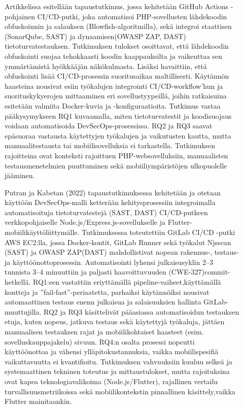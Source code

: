 \documentclass[bscthesis,finnish,oneside,biblatex]{uefcsthesis}
\begin{document}
\begin{description}
    \item[\cite{afifah2024_coi}] Artikkelissa esitellään tapaustutkimus, jossa kehitetään GitHub Actions -pohjainen CI/CD-putki, joka automatisoi PHP-sovellusten lähdekoodin obfuskoinnin ja salauksen (Blowfish-algoritmilla), sekä integroi staattisen (SonarQube, SAST) ja dynaamisen(OWASP ZAP, DAST) tietoturvatestauksen. Tutkimuksen tulokset osoittavat, että lähdekoodin obfuskointi suojaa tehokkaasti koodin kaappauksilta ja vaikeuttaa sen ymmärtämistä hyökkääjän näkökulmasta. Lisäksi havaittiin, että obfuskointi lisää CI/CD-prosessin suoritusaikaa maltillisesti. Käytännön haasteina nousivat esiin työkalujen integrointi CI/CD-workflow’hun ja suorituskykyerojen mittaaminen eri sovellustyypeillä, joihin ratkaisuina esitetään valmiita Docker-kuvia ja -konfiguraatioita. Tutkimus vastaa pääkysymykseen RQ1 kuvaamalla, miten tietoturvatestit ja koodisuojaus voidaan automatisoida DevSecOps-prosessissa. RQ2 ja RQ3 saavat epäsuoraa vastausta käytettyjen työkalujen ja vaikutusten kautta, mutta manuaalitestausta tai mobiilisovelluksia ei tarkastella. Tutkimuksen rajoitteina ovat konteksti rajoittuen PHP-websovelluksiin, manuaalisten testausmenetelmien puuttuminen sekä mobiiliympäristöjen ulkopuolelle jääminen.
\end{description}

\begin{description}
    \item[\cite{putra2022_devsecops}]Putran ja Kabetan (2022) tapaustutkimuksessa kehitetään ja otetaan käyttöön DevSecOps-malli ketterään kehitysprosessiin integroimalla automatisoituja tietoturvatestejä (SAST, DAST) CI/CD-putkeen verkkopohjaiselle Node.js/Express.js-sovellukselle ja Flutter-mobiilikäyttöliittymälle. Tutkimuksessa toteutettiin GitLab CI/CD -putki AWS EC2:lla, jossa Docker-kontit, GitLab Runner sekä työkalut Njsscan (SAST) ja OWASP ZAP(DAST) mahdollistivat nopean rakennus-, testaus- ja käyttöönottoprosessin. Automatisointi lyhensi julkaisusyklin 2–3 tunnista 3–4 minuuttiin ja paljasti haavoittuvuuden (CWE-327)commit-hetkellä. RQ1:een vastattiin eriyttämällä pipeline-vaiheet,käyttämällä kontteja ja ”fail-fast”-periaatetta, parhaiksi käytännöiksi nousivat automaattinen testaus enenn julkaisua ja salaisuuksien hallinta GitLab-muuttujilla. RQ2 ja RQ3 käsittelivät pääasiassa automatisoidun testauksen etuja, kuten nopeus, jatkuva testaus sekä käytettyjä työkaluja, jättäen manuaalisen testauksen rajat ja mobiilikohtaiset haasteet (esim. sovelluskauppajakelu) sivuun. RQ4:n osalta prosessi nopeutti käyttöönottoa ja vähensi ylläpitokustannuksia, vaikka mobiilispesifiä vaikuttavuutta ei kvantifioitu. Tutkimuksen vahvuuksiin kuuluu selkeä ja systemaattinen tekninen toteutus ja mittaustulokset, mutta rajoituksina ovat kapea teknologiavalikoima (Node.js/Flutter), rajallinen vertailu turvallisuusmetriikoissa sekä mobiilikontekstin pinnallinen käsittely,vaikka Flutter mainitaankin.
\end{description}
\end{document}
